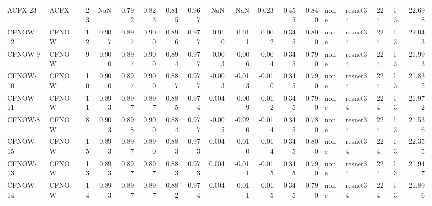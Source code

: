 \begin{tabular}{llrrrrrrrrrrrllllr}
  ACFX-23 &   ACFX &     23 &              NaN &         0.792 &        0.823 &                   0.815 &       0.967 &                 NaN &            NaN &             0.023 &          0.455 &              0.840 &       none & resnet34 &        224 &     l3 &       22.698 \\
 CFNOW-12 &  CFNOW &     12 &            0.907 &         0.897 &        0.900 &                   0.896 &       0.977 &              -0.010 &         -0.011 &            -0.002 &          0.345 &              0.800 &       none & resnet34 &        224 &     l3 &       22.043 \\
  CFNOW-9 &  CFNOW &      9 &            0.900 &         0.897 &        0.900 &                   0.894 &       0.977 &              -0.003 &         -0.006 &            -0.004 &          0.345 &              0.790 &       none & resnet34 &        224 &     l3 &       21.993 \\
 CFNOW-10 &  CFNOW &     10 &            0.900 &         0.897 &        0.900 &                   0.887 &       0.977 &              -0.003 &         -0.013 &            -0.010 &          0.345 &              0.790 &       none & resnet34 &        224 &     l3 &       21.832 \\
 CFNOW-11 &  CFNOW &     11 &            0.893 &         0.897 &        0.897 &                   0.885 &       0.974 &               0.004 &         -0.009 &            -0.012 &          0.345 &              0.790 &       none & resnet34 &        224 &     l3 &       21.972 \\
  CFNOW-8 &  CFNOW &      8 &            0.903 &         0.898 &        0.900 &                   0.884 &       0.977 &              -0.005 &         -0.020 &            -0.014 &          0.345 &              0.780 &       none & resnet34 &        224 &     l3 &       21.536 \\
 CFNOW-15 &  CFNOW &     15 &            0.893 &         0.897 &        0.890 &                   0.883 &       0.973 &               0.004 &         -0.010 &            -0.014 &          0.345 &              0.800 &       none & resnet34 &        224 &     l3 &       22.355 \\
 CFNOW-13 &  CFNOW &     13 &            0.893 &         0.897 &        0.897 &                   0.883 &       0.973 &               0.004 &         -0.011 &            -0.015 &          0.345 &              0.790 &       none & resnet34 &        224 &     l3 &       21.947 \\
 CFNOW-14 &  CFNOW &     14 &            0.893 &         0.897 &        0.897 &                   0.882 &       0.974 &               0.004 &         -0.011 &            -0.015 &          0.345 &              0.790 &       none & resnet34 &        224 &     l3 &       21.896 \\

\end{tabular}
